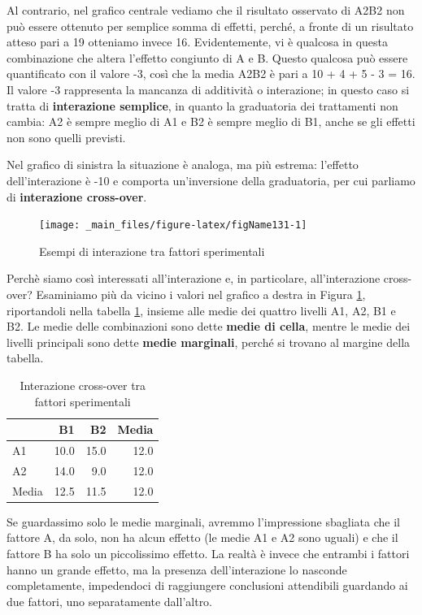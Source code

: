 \documentclass[a4paper,12pt,oneside]{book}
\begin{document}
Al contrario, nel grafico centrale vediamo che il risultato osservato di A2B2 non può essere ottenuto per semplice somma di effetti, perché, a fronte di un risultato atteso pari a 19 otteniamo invece 16. Evidentemente, vi è qualcosa in questa combinazione che altera l'effetto congiunto di A e B. Questo qualcosa può essere quantificato con il valore -3, così che la media A2B2 è pari a 10 + 4 + 5 - 3 = 16. Il valore -3 rappresenta la mancanza di additività o interazione; in questo caso si tratta di \textbf{interazione semplice}, in quanto la graduatoria dei trattamenti non cambia: A2 è sempre meglio di A1 e B2 è sempre meglio di B1, anche se gli effetti non sono quelli previsti.

Nel grafico di sinistra la situazione è analoga, ma più estrema: l'effetto dell'interazione è -10 e comporta un'inversione della graduatoria, per cui parliamo di \textbf{interazione cross-over}.

\begin{figure}

{\centering \texttt{[image: \_main\_files/figure-latex/figName131-1]} 

}

\caption{Esempi di interazione tra fattori sperimentali}\label{fig:figName131}
\end{figure}

Perchè siamo così interessati all'interazione e, in particolare, all'interazione cross-over? Esaminiamo più da vicino i valori nel grafico a destra in Figura \ref{fig:figName131}, riportandoli nella tabella \ref{tab:tabName131}, insieme alle medie dei quattro livelli A1, A2, B1 e B2. Le medie delle combinazioni sono dette \textbf{medie di cella}, mentre le medie dei livelli principali sono dette \textbf{medie marginali}, perché si trovano al margine della tabella.

\begin{table}

\caption{\label{tab:tabName131}Interazione cross-over tra fattori sperimentali}
\centering
\begin{tabular}[t]{lrrr}
\toprule
  & B1 & B2 & Media\\
\midrule
A1 & 10.0 & 15.0 & 12.0\\
A2 & 14.0 & 9.0 & 12.0\\
Media & 12.5 & 11.5 & 12.0\\
\bottomrule
\end{tabular}
\end{table}

Se guardassimo solo le medie marginali, avremmo l'impressione sbagliata che il fattore A, da solo, non ha alcun effetto (le medie A1 e A2 sono uguali) e che il fattore B ha solo un piccolissimo effetto. La realtà è invece che entrambi i fattori hanno un grande effetto, ma la presenza dell'interazione lo nasconde completamente, impedendoci di raggiungere conclusioni attendibili guardando ai due fattori, uno separatamente dall'altro.
\end{document}
